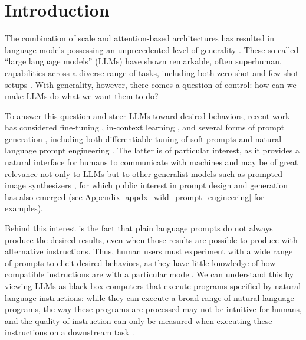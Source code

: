 \section{Introduction}\label{sec:intro}
The combination of scale and attention-based architectures has resulted in language models possessing an unprecedented level of generality \citep{kaplan2020scaling,vaswani2017attention}. These so-called ``large language models'' (LLMs) have shown remarkable, often superhuman, capabilities across a diverse range of tasks, including both zero-shot and few-shot setups \citep{brown2020language,srivastava2022beyond}. With generality, however, there comes a question of control: how can we make LLMs do what we want them to do? 

To answer this question and steer LLMs toward desired behaviors, recent work has considered fine-tuning \citep{ouyang2022training,ziegler2019fine}, in-context learning \citep{brown2020language}, and several forms of prompt generation \citep{gao2021prompting}, including both differentiable tuning of soft prompts \citep{qin2021learning,lester2021power} and natural language prompt engineering \citep{reynolds2021prompt}. The latter is of particular interest, as it provides a natural interface for humans to communicate with machines and may be of great relevance not only to LLMs but to other generalist models such as prompted image synthesizers \citep{rombach2022high,ramesh2022hierarchical}, for which public interest in prompt design and generation has also emerged (see Appendix \ref{appdx_wild_prompt_engineering} for examples).

Behind this interest is the fact that plain language prompts do not always produce the desired results, even when those results are possible to produce with alternative instructions. Thus, human users must experiment with a wide range of prompts to elicit desired behaviors, as they have little knowledge of how compatible instructions are with a particular model.
We can understand this by viewing LLMs as black-box computers that execute programs specified by natural language instructions: while they can execute a broad range of natural language programs, the way these programs are processed may not be intuitive for humans, and the quality of instruction can only be measured when executing these instructions on a downstream task \citep{sanh2022multitask, wei2021finetuned}. 

